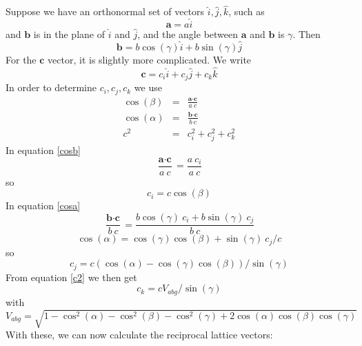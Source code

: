 \documentclass[prb]{revtex4}%
\begin{document}
Suppose we have an orthonormal set of vectors $\widehat{i}, \widehat{j}, \widehat{k}$, such as
\begin{equation}
    \textbf{a} = a \widehat{i}
\end{equation}
and  $\textbf{b}$ is in the plane of $\widehat{i}$ and $\widehat{j}$, and the angle between $\textbf{a}$ and $\textbf{b}$ is $\gamma$. Then
\begin{equation}
    \textbf{b} = b \cos(\gamma) \widehat{i} + b \sin(\gamma)
    \widehat{j}
\end{equation}
For the $\textbf{c}$ vector, it is slightly more complicated. We write
\begin{equation}
    \textbf{c} = c_i \widehat{i} + c_j \widehat{j} + c_k \widehat{k}
\end{equation}
In order to determine $c_i, c_j, c_k$ we use
\begin{eqnarray}
  \cos(\beta) &=& \frac{\textbf{a} \cdot \textbf{c}}{a\ c} \label{cosb}\\
  \cos(\alpha) &=& \frac{\textbf{b} \cdot \textbf{c}}{b\ c} \label{cosa}\\
  c^2 &=& c_i ^2 + c_j ^2 +c_k ^2\label{c2}
\end{eqnarray}
In equation \ref{cosb}
\begin{equation}
    \frac{\textbf{a} \cdot \textbf{c}}{a\ c} = \frac{a\ c_i}{a\ c}
\end{equation}
so
\begin{equation}
    c_i = c \cos(\beta)
\end{equation}
In equation \ref{cosa}
\begin{equation}
    \frac{\textbf{b} \cdot \textbf{c}}{b\ c} = \frac{b \cos(\gamma)\ c_i +b \sin(\gamma)\ c_j }{b\ c}
\end{equation}
\begin{equation}
   \cos(\alpha) = \cos(\gamma) \cos(\beta) + \sin(\gamma)\ c_j/c
\end{equation}
so
\begin{equation}
   c_j = c (\cos(\alpha) - \cos(\gamma) \cos(\beta)) / \sin(\gamma)
\end{equation}
From equation \ref{c2} we then get
\begin{equation}
    c_k = c V_{abg}/\sin(\gamma)
\end{equation}
with
\begin{equation}
    V_{abg} = \sqrt{1-\cos^2(\alpha)-\cos^2(\beta)-\cos^2(\gamma)+2 \cos(\alpha) \cos(\beta) \cos(\gamma)}
\end{equation}
With these, we can now calculate the reciprocal lattice vectors:
\end{document}
